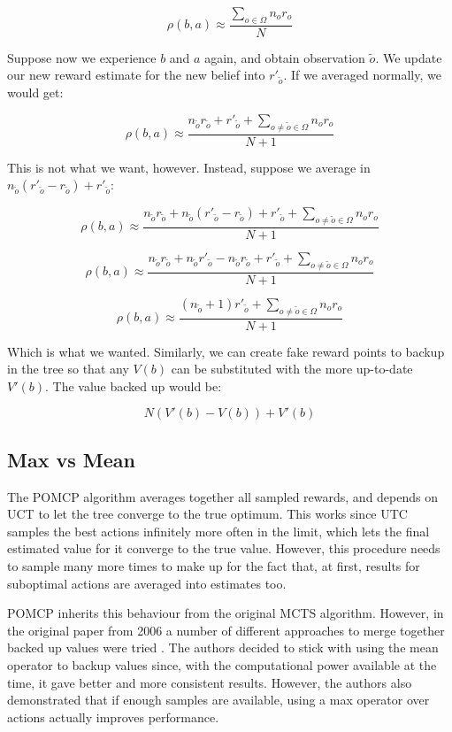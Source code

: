 \[ \rho(b,a) \approx \frac{\sum_{o\in\Omega} n_o r_o}{N} \]

Suppose now we experience $b$ and $a$ again, and obtain observation $\tilde{o}$. We update our new
reward estimate for the new belief into $r'_{\tilde{o}}$. If we averaged normally, we would get:

\[ \rho(b,a) \approx \frac{ n_{\tilde{o}} r_{\tilde{o}} + r'_{\tilde{o}} +
\sum_{o \neq \tilde{o} \in \Omega} n_o r_o}{N+1} \]

This is not what we want, however. Instead, suppose we average in $n_{\tilde{o}}(r'_{\tilde{o}} -
r_{\tilde{o}}) + r'_{\tilde{o}}$:

\[ \rho(b,a) \approx \frac{ n_{\tilde{o}} r_{\tilde{o}} + n_{\tilde{o}}(r'_{\tilde{o}} -
r_{\tilde{o}}) + r'_{\tilde{o}} +
\sum_{o \neq \tilde{o} \in \Omega} n_o r_o}{N+1} \]

\[ \rho(b,a) \approx \frac{ n_{\tilde{o}} r_{\tilde{o}} + n_{\tilde{o}}r'_{\tilde{o}} -
        n_{\tilde{o}} r_{\tilde{o}} + r'_{\tilde{o}} +
\sum_{o \neq \tilde{o} \in \Omega} n_o r_o}{N+1} \]

\[ \rho(b,a) \approx \frac{ ( n_{\tilde{o}}+1) r'_{\tilde{o}} +
\sum_{o \neq \tilde{o} \in \Omega} n_o r_o}{N+1} \]

Which is what we wanted. Similarly, we can create fake reward points to backup in the tree so that
any $V(b)$ can be substituted with the more up-to-date $V'(b)$. The value backed up would be:

\[ N ( V'(b) - V(b) ) + V'(b) \]

\subsection{Max vs Mean}

The POMCP algorithm averages together all sampled rewards, and depends on UCT to let the tree
converge to the true optimum. This works since UTC samples the best actions infinitely more often in
the limit, which lets the final estimated value for it converge to the true value. However, this
procedure needs to sample many more times to make up for the fact that, at first, results for
suboptimal actions are averaged into estimates too.

POMCP inherits this behaviour from the original MCTS algorithm. However, in the original paper from
2006 a number of different approaches to merge together backed up values were tried
\cite{cit:mcts}. The authors decided to stick with using the mean operator to backup values since,
with the computational power available at the time, it gave better and more consistent results.
However, the authors also demonstrated that if enough samples are available, using a max operator
over actions actually improves performance.

